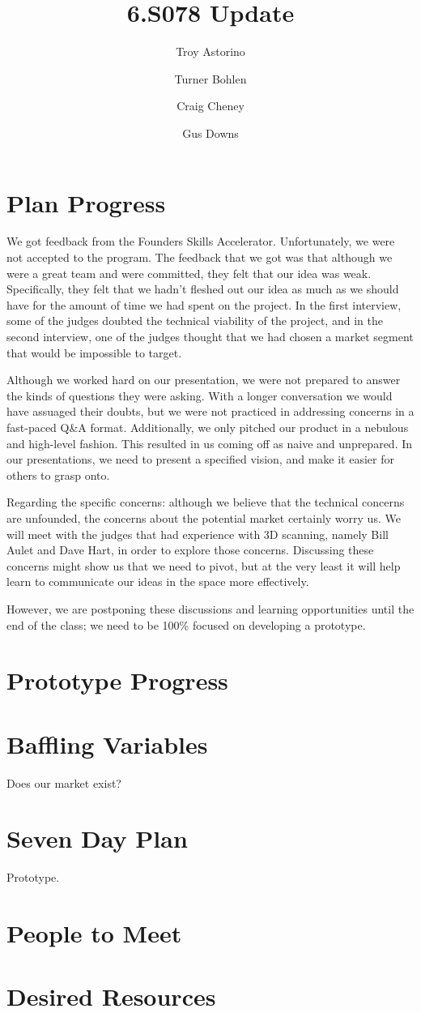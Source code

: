 \documentclass[10pt]{article}
\title{\vspace{-4em}6.S078 Update}
\author{Troy Astorino \and Turner Bohlen \and Craig Cheney \and Gus Downs}
\begin{document}
\maketitle
\vspace{-4em}

\section{Plan Progress}
We got feedback from the Founders Skills Accelerator. Unfortunately, we were not
accepted to the program.  The feedback that we got was that although we were a
great team and were committed, they felt that our idea was weak. Specifically,
they felt that we hadn't fleshed out our idea as much as we should have for the
amount of time we had spent on the project. In the first interview, some of the
judges doubted the technical viability of the project, and in the second
interview, one of the judges thought that we had chosen a market segment that
would be impossible to target.

Although we worked hard on our presentation, we were not prepared to answer the
kinds of questions they were asking. With a longer conversation we would have
assuaged their doubts, but we were not practiced in addressing concerns in a
fast-paced Q&A format. Additionally, we only pitched our product in a nebulous
and high-level fashion. This resulted in us coming off as naive and unprepared.
In our presentations, we need to present a specified vision, and make it easier
for others to grasp onto.

Regarding the specific concerns: although we believe that the technical concerns
are unfounded, the concerns about the potential market certainly worry us. We
will meet with the judges that had experience with 3D scanning, namely Bill
Aulet and Dave Hart, in order to explore those concerns. Discussing these
concerns might show us that we need to pivot, but at the very least it will help
learn to communicate our ideas in the space more effectively. 

However, we are postponing these discussions and learning opportunities until
the end of the class; we need to be 100\% focused on developing a prototype.

\section{Prototype Progress}

\section{Baffling Variables}
Does our market exist? 

\section{Seven Day Plan}
Prototype.

\section{People to Meet}

\section{Desired Resources}
\end{document}
